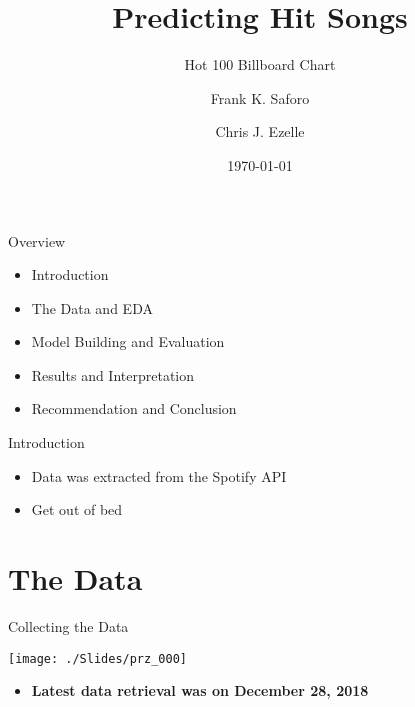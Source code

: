 \documentclass[ignorenonframetext,]{beamer}
\title[]{Predicting Hit Songs}
\subtitle{Hot 100 Billboard Chart}
\author[
        Frank K. Saforo \and Chris J. Ezelle
    ]{Frank K. Saforo \and Chris J. Ezelle}
\date[
      \today
  ]{
      \today
        }
\providecommand{\tightlist}{%
  \setlength{\itemsep}{0pt}\setlength{\parskip}{0pt}}
\begin{document}
  \begin{frame}[plain]
  \titlepage
  \end{frame}



\begin{frame}{Overview}
\protect\hypertarget{overview}{}

\begin{itemize}
\item
  Introduction
\item
  The Data and EDA
\item
  Model Building and Evaluation
\item
  Results and Interpretation
\item
  Recommendation and Conclusion
\end{itemize}

\end{frame}

\begin{frame}{Introduction}
\protect\hypertarget{introduction}{}

\begin{itemize}
\tightlist
\item
  Data was extracted from the Spotify API
\item
  Get out of bed
\end{itemize}

\end{frame}

\hypertarget{the-data}{%
\section{The Data}\label{the-data}}

\begin{frame}{Collecting the Data}
\protect\hypertarget{collecting-the-data}{}

\begin{center}\texttt{[image: ./Slides/prz\_000]} \end{center}

\begin{itemize}
\tightlist
\item
  \textbf{Latest data retrieval was on December 28, 2018}
\end{itemize}

\end{frame}
\end{document}
